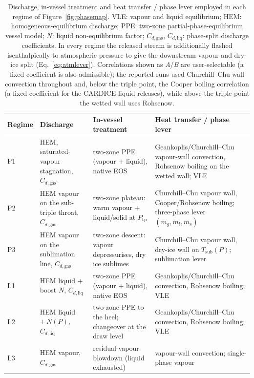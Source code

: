 \documentclass[5p,authoryear]{elsarticle}
\begin{document}
\begin{table}[!tbh]
\centering
\caption{Discharge, in-vessel treatment and heat transfer / phase lever employed in each regime of
Figure~\ref{fig:phasemap}. VLE: vapour and liquid equilibrium; HEM: homogeneous-equilibrium
discharge; PPE: two-zone partial-phase-equilibrium vessel model; $N$: liquid non-equilibrium factor;
$C_{d,\text{gas}}$, $C_{d,\text{liq}}$: phase-split discharge coefficients. In every regime the
released stream is additionally flashed isenthalpically to atmospheric pressure to give the
downstream vapour and dry-ice split (Eq.~\eqref{eq:atmlever}). Correlations shown as \emph{A}/\emph{B}
are user-selectable (a fixed coefficient is also admissible); the reported runs used Churchill--Chu
wall convection throughout and, below the triple point, the Cooper boiling correlation (a fixed
coefficient for the CARDICE liquid releases), while above the triple point the wetted wall uses
Rohsenow.}
\label{tab:phasemodels}
\footnotesize
\begin{tabularx}{\textwidth}{@{}l X X X@{}}
\toprule
Regime & Discharge & In-vessel treatment & Heat transfer / phase lever \\
\midrule
P1 & HEM, saturated-vapour stagnation, $C_{d,\text{gas}}$ & two-zone PPE (vapour $+$ liquid), native EOS & Geankoplis/Churchill--Chu vapour-wall convection, Rohsenow boiling on the wetted wall; VLE \\
P2 & HEM vapour on the sub-triple throat, $C_{d,\text{gas}}$ & two-zone plateau: warm vapour $+$ liquid/solid at $P_\text{tp}$ & Churchill--Chu vapour wall, Cooper/Rohsenow boiling; three-phase lever $(m_g,m_l,m_s)$ \\
P3 & HEM vapour on the sublimation line, $C_{d,\text{gas}}$ & two-zone descent: vapour depressurises, dry ice sublimes & Churchill--Chu vapour wall, dry-ice wall on $T_\text{sub}(P)$; sublimation lever \\
L1 & HEM liquid $+$ boost $N$, $C_{d,\text{liq}}$ & two-zone PPE (vapour $+$ liquid), native EOS & Geankoplis/Churchill--Chu convection, Rohsenow boiling; VLE \\
L2 & HEM liquid $+\,N(P)$, $C_{d,\text{liq}}$ & two-zone PPE to the heel; changeover at the draw level & Geankoplis/Churchill--Chu convection, Rohsenow boiling; VLE \\
L3 & HEM vapour, $C_{d,\text{gas}}$ & residual-vapour blowdown (liquid exhausted) & vapour-wall convection; single-phase vapour \\
\bottomrule
\end{tabularx}
\end{table}
\end{document}
